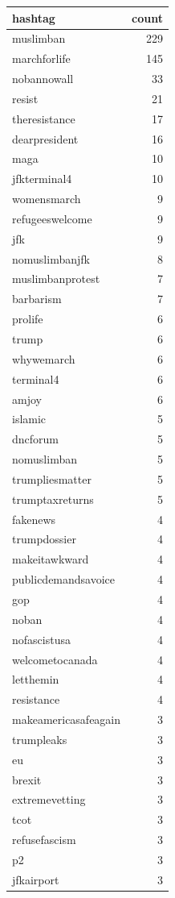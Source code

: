 \begin{tabular}{lr}
\toprule
hashtag & count \\
\midrule
muslimban & 229 \\
marchforlife & 145 \\
nobannowall & 33 \\
resist & 21 \\
theresistance & 17 \\
dearpresident & 16 \\
maga & 10 \\
jfkterminal4 & 10 \\
womensmarch & 9 \\
refugeeswelcome & 9 \\
jfk & 9 \\
nomuslimbanjfk & 8 \\
muslimbanprotest & 7 \\
barbarism & 7 \\
prolife & 6 \\
trump & 6 \\
whywemarch & 6 \\
terminal4 & 6 \\
amjoy & 6 \\
islamic & 5 \\
dncforum & 5 \\
nomuslimban & 5 \\
trumpliesmatter & 5 \\
trumptaxreturns & 5 \\
fakenews & 4 \\
trumpdossier & 4 \\
makeitawkward & 4 \\
publicdemandsavoice & 4 \\
gop & 4 \\
noban & 4 \\
nofascistusa & 4 \\
welcometocanada & 4 \\
letthemin & 4 \\
resistance & 4 \\
makeamericasafeagain & 3 \\
trumpleaks & 3 \\
eu & 3 \\
brexit & 3 \\
extremevetting & 3 \\
tcot & 3 \\
refusefascism & 3 \\
p2 & 3 \\
jfkairport & 3 \\

\end{tabular}

